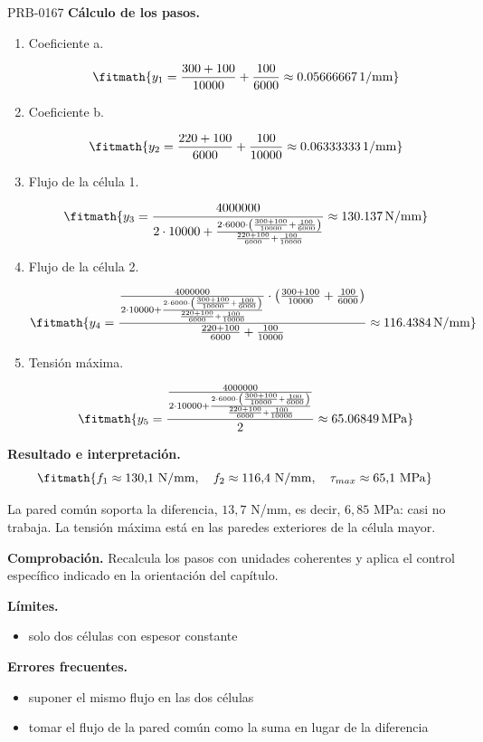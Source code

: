 \begin{studiumworked}{PRB-0167}
\textbf{Cálculo de los pasos.}

\begin{enumerate}

\item Coeficiente a.

\[\fitmath{y_{1}=\frac{300+100}{10000}+\frac{100}{6000}\approx 0.05666667\,\mathrm{1/mm}}\]

\item Coeficiente b.

\[\fitmath{y_{2}=\frac{220+100}{6000}+\frac{100}{10000}\approx 0.06333333\,\mathrm{1/mm}}\]

\item Flujo de la célula 1.

\[\fitmath{y_{3}=\frac{4000000}{2\cdot 10000+\frac{2\cdot 6000\cdot \left(\frac{300+100}{10000}+\frac{100}{6000}\right)}{\frac{220+100}{6000}+\frac{100}{10000}}}\approx 130.137\,\mathrm{N/mm}}\]

\item Flujo de la célula 2.

\[\fitmath{y_{4}=\frac{\frac{4000000}{2\cdot 10000+\frac{2\cdot 6000\cdot \left(\frac{300+100}{10000}+\frac{100}{6000}\right)}{\frac{220+100}{6000}+\frac{100}{10000}}}\cdot \left(\frac{300+100}{10000}+\frac{100}{6000}\right)}{\frac{220+100}{6000}+\frac{100}{10000}}\approx 116.4384\,\mathrm{N/mm}}\]

\item Tensión máxima.

\[\fitmath{y_{5}=\frac{\frac{4000000}{2\cdot 10000+\frac{2\cdot 6000\cdot \left(\frac{300+100}{10000}+\frac{100}{6000}\right)}{\frac{220+100}{6000}+\frac{100}{10000}}}}{2}\approx 65.06849\,\mathrm{MPa}}\]

\end{enumerate}

\textbf{Resultado e interpretación.}\[\fitmath{f_1 \approx 130{,}1\ \mathrm{N/mm},\quad f_2 \approx 116{,}4\ \mathrm{N/mm},\quad \tau_{max} \approx 65{,}1\ \mathrm{MPa}}\]

La pared común soporta la diferencia, $13{,}7$ N/mm, es decir, $6{,}85$ MPa: casi no trabaja. La tensión máxima está en las paredes exteriores de la célula mayor.

\par\textbf{Comprobación.} Recalcula los pasos con unidades coherentes y aplica el control específico indicado en la orientación del capítulo.

\textbf{Límites.}\begin{itemize}\item solo dos células con espesor constante\end{itemize}

\textbf{Errores frecuentes.}\begin{itemize}\item suponer el mismo flujo en las dos células
\item tomar el flujo de la pared común como la suma en lugar de la diferencia\end{itemize}

\end{studiumworked}

